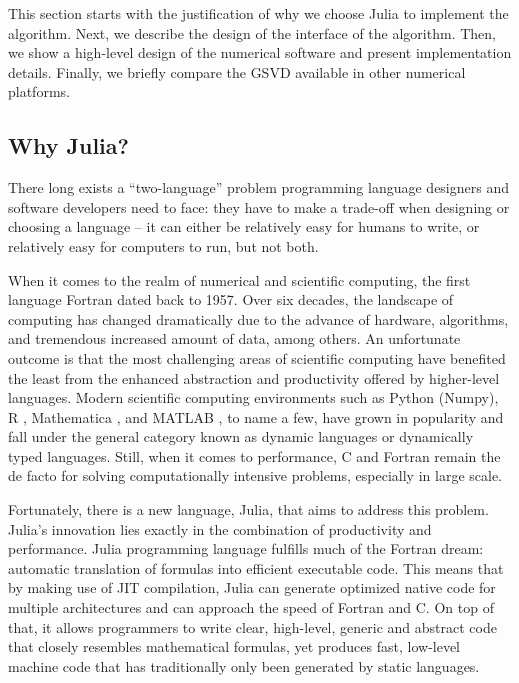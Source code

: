 This section starts with the justification of why we choose Julia to implement the algorithm. Next, we describe the design of the interface of the algorithm. Then, we show a high-level design of the numerical software and present implementation details. Finally, we briefly compare the GSVD available in other numerical platforms. 

\subsection{Why Julia?}
There long exists a ``two-language'' problem programming language designers and software developers need to face: they have to make a trade-off when designing or choosing a language -- it can either be relatively easy for humans to write, or relatively easy for computers to run, but not both. \cite{perkel2019julia}

When it comes to the realm of numerical and scientific computing, the first language Fortran dated back to 1957. Over six decades, the landscape of computing has changed dramatically due to the advance of hardware, algorithms, and tremendous increased amount of data, among others. An unfortunate outcome is that the most challenging areas of scientific computing have benefited the least from the enhanced abstraction and productivity offered by higher-level languages. Modern scientific computing environments such as Python (Numpy)\cite{van2011numpy}, R \cite{ihaka1996r}, Mathematica \cite{math}, and MATLAB \cite{MATLAB}, to name a few, have grown in popularity and fall under the general category known as dynamic languages or dynamically typed languages. Still, when it comes to performance, C and Fortran remain the de facto for solving computationally intensive problems, especially in large scale. 

Fortunately, there is a new language, Julia, that aims to address this problem. Julia’s innovation lies exactly in the combination of productivity and performance. \cite{bezanson2017julia} Julia programming language fulfills much of the Fortran dream: automatic translation of formulas into efficient executable code. This means that by making use of JIT compilation, Julia can generate optimized native code for multiple architectures and can approach the speed of Fortran and C. On top of that, it allows programmers to write clear, high-level, generic and abstract code that closely resembles mathematical formulas, yet produces fast, low-level machine code that has traditionally only been generated by static languages.

